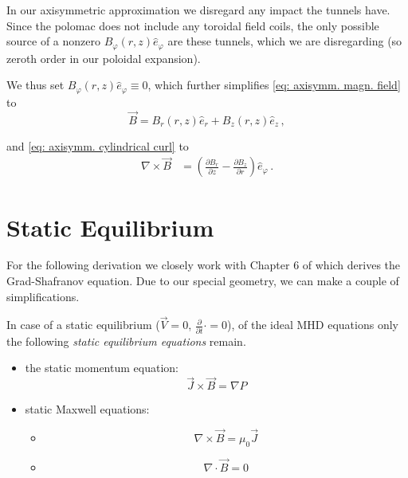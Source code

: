 In our axisymmetric approximation we disregard any impact the tunnels have. Since the polomac does not include any toroidal field coils,
the only possible source of a nonzero $B_\varphi(r,z) \hat{e}_\varphi$ are these tunnels, which we are disregarding (so zeroth order in our poloidal expansion).

We thus set $B_\varphi(r,z) \hat{e}_\varphi \equiv 0$, which further simplifies \eqref{eq: axisymm. magn. field} to
\begin{equation}
    \vec{B} = B_r (r,z) \hat{e}_r + B_z(r,z) \hat{e}_z  \, ,
    \label{eq: axisymm. pol. magn. field}
\end{equation}

and \eqref{eq: axisymm. cylindrical curl} to 
\begin{align}
    \nabla \times \vec{B} &= \left(\frac{\partial B_r}{\partial z} - \frac{\partial B_z}{\partial r}\right)\hat{e}_\varphi   \, .
    \label{eq: poloidal cylindrical curl}
\end{align}



\section{Static Equilibrium}

For the following derivation we closely work with Chapter 6 of \cite{Freidberg2014} which derives the Grad-Shafranov equation.
Due to our special geometry, we can make a couple of simplifications.

In case of a static equilibrium ($\vec{V}=0$, $\frac{\partial}{\partial t} \cdot =0$), 
of the ideal MHD equations only the following \emph{static equilibrium equations} remain.

\begin{itemize}
    \item the static momentum equation:
            \begin{equation}
                 \vec{J} \times \vec{B} = \nabla P
                 \label{eq: static momentum eq.}
            \end{equation}

    \item static Maxwell equations:
        \begin{itemize}
            \item 
                \begin{equation}
                    \nabla\times\vec{B} =  \mu_0 \vec{J}
                \end{equation}
            \item
                \begin{equation}
                    \nabla\cdot\vec{B} = 0
                \end{equation}
        \end{itemize}
\end{itemize}



